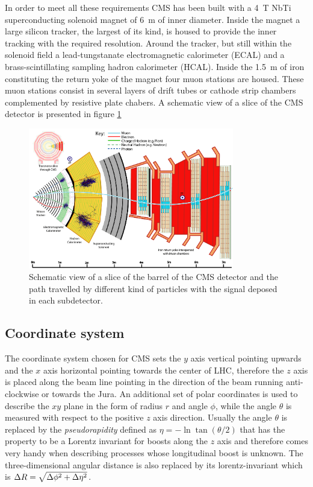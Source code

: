 In order to meet all these requirements CMS has been built with a 4~T NbTi superconducting solenoid magnet of 6~m of inner diameter. Inside the magnet a large silicon tracker, the largest of its kind, is housed to provide the inner tracking with the required resolution. Around the tracker, but still within the solenoid field a lead-tungstanate electromagnetic calorimeter (ECAL) and a brass-scintillating sampling hadron calorimeter (HCAL). Inside the 1.5~m of iron constituting the return yoke of the magnet four muon stations are housed. These muon stations consist in several layers of drift tubes or cathode strip chambers complemented by resistive plate chabers. A schematic view of a slice of the CMS detector is presented in figure \ref{fig:cmsdet}

\begin{figure}
\begin{center}
\includegraphics[angle=-0,width=0.8\textwidth]{2_LHC_and_CMS/pics/CMS_Slice_HD.png}
\caption{Schematic view of a slice of the barrel of the CMS detector and the path travelled by different kind of particles with the signal deposed in each subdetector.
\label{fig:cmsdet}
}
\end{center}
\end{figure}


\subsection{Coordinate system}
The coordinate system chosen for CMS sets the $y$ axis vertical pointing upwards and the $x$ axis horizontal pointing towards the center of LHC, therefore the $z$ axis is placed along the beam line pointing in the direction of the beam running anti-clockwise or towards the Jura. An additional set of polar coordinates is used to describe the $xy$ plane in the form of radius $r$ and angle $\phi$, while the angle $\theta$ is measured with respect to the positive $z$ axis direction. Usually the angle $\theta$ is replaced by the \emph{pseudorapidity} defined as $\eta=-\ln \tan(\theta/2)$ that has the property to be a Lorentz invariant for boosts along the $z$ axis and therefore comes very handy when describing processes whose longitudinal boost is unknown. The three-dimensional angular distance is also replaced by its lorentz-invariant which is $\Delta R=\sqrt{\Delta\phi^2+\Delta\eta^2}$.

